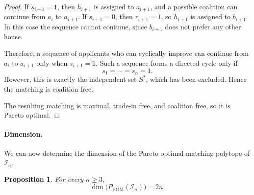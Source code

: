 \documentclass[12pt]{report}
\newtheorem{pprop}[base]{Proposition}
\numberwithin{algorithm}{chapter}
\begin{document}
\begin{proof}
		If $s_{i+1}=1$, then $h_{i+1}$ is assigned to $a_{i+1}$, and a possible coalition can continue from $a_i$ to $a_{i+1}$. If $s_{i+1}=0$, then $r_{i+1}=1$, so $h_{i+1}$ is assigned to $b_{i+1}$. In this case the sequence cannot continue, since $b_{i+1}$ does not prefer any other house.
		
		Therefore, a sequence of applicants who can cyclically improve can continue from $a_i$ to $a_{i+1}$ only when $s_{i+1}=1$. Such a sequence forms a directed cycle only if
		\[
		s_1=\cdots=s_n=1.
		\]
		However, this is exactly the independent set $S^{*}$, which has been excluded. Hence the matching is coalition free.
		
		The resulting matching is maximal, trade-in free, and coalition free, so it is Pareto optimal.
	\end{proof}
	
	\paragraph{Dimension.}
	We can now determine the dimension of the Pareto optimal matching polytope of $\mathcal{I}_n$.
	
	\begin{pprop}
		For every $n\ge 3$,
		\[
		\dim\bigl(P_{\mathrm{POM}}(\mathcal{I}_n)\bigr)=2n.
		\]
	\end{pprop}
	
\end{document}
